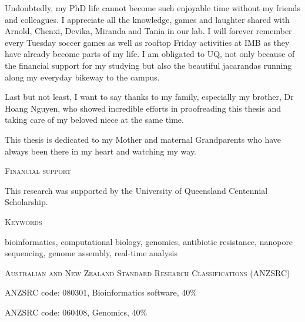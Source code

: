 \vspace{.3cm}

Undoubtedly, my PhD life cannot become such enjoyable time without my friends and colleagues. I appreciate all the knowledge, games and laughter shared with Arnold, Chenxi, Devika, Miranda and Tania in our lab. I will forever remember every Tuesday soccer games as well as rooftop Friday activities at IMB as they have already become parts of my life. I am obligated to UQ, not only because of the financial support for my studying but also the beautiful jacarandas running along my everyday bikeway to the campus. 

\vspace{.3cm}

Last but not least, I want to say thanks to my family, especially my brother, Dr Hoang Nguyen, who showed incredible efforts in proofreading this thesis and taking care of my beloved niece at the same time.

\vspace{.3cm}

This thesis is dedicated to my Mother and maternal Grandparents who have always been there in my heart and watching my way.  

\afterpage{\null\thispagestyle{empty}\newpage}
\newpage


\thispagestyle{plain}

\begin{center}
\Large \textsc{Financial support}
\end{center}

This research was supported by the University of Queensland Centennial Scholarship.

\vspace{2cm}
\begin{center}
\Large \textsc{Keywords}
\end{center}

bioinformatics, computational biology, genomics, antibiotic resistance, nanopore sequencing, genome assembly, real-time analysis

\vspace{2cm}
\begin{center}
\Large \textsc{Australian and New Zealand Standard Research Classifications (ANZSRC)}
\end{center}

ANZSRC code: 080301, Bioinformatics software, 40\%

ANZSRC code: 060408, Genomics, 40\%

